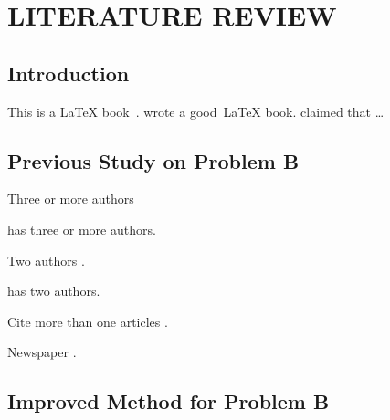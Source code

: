 \chapter{LITERATURE REVIEW}
\label{ch:litreview}

\section{Introduction}

This is a \LaTeX{} book~\parencite{urban1986introduction}.  \textcite{lamport1994latex} wrote a good~\LaTeX{} book. \textcite{Knu86book} claimed that \ldots

\section{Previous Study on Problem B}

Three or more authors \parencite{mittelbach2004latex}

\textcite{mittelbach2004latex} has three or more authors.

Two authors \parencite{kopka1995guide}.

\textcite{kopka1995guide} has two authors.

Cite more than one articles \parencite{urban1986introduction,lamport1994latex}.

Newspaper \parencite{afp_covid_2021}.

\section{Improved Method for Problem B}

\lipsum[4-5]
